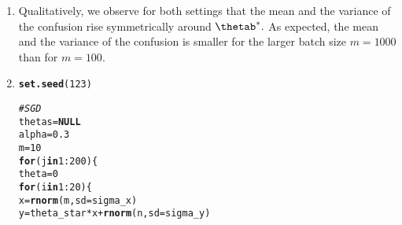 \documentclass[a4paper]{article}
\makeatletter
\newcommand{\hlnum}[1]{\textcolor[rgb]{0.686,0.059,0.569}{#1}}%
\newcommand{\hlstr}[1]{\textcolor[rgb]{0.192,0.494,0.8}{#1}}%
\newcommand{\hlcom}[1]{\textcolor[rgb]{0.678,0.584,0.686}{\textit{#1}}}%
\newcommand{\hlopt}[1]{\textcolor[rgb]{0,0,0}{#1}}%
\newcommand{\hlstd}[1]{\textcolor[rgb]{0.345,0.345,0.345}{#1}}%
\newcommand{\hlkwa}[1]{\textcolor[rgb]{0.161,0.373,0.58}{\textbf{#1}}}%
\newcommand{\hlkwb}[1]{\textcolor[rgb]{0.69,0.353,0.396}{#1}}%
\newcommand{\hlkwc}[1]{\textcolor[rgb]{0.333,0.667,0.333}{#1}}%
\newcommand{\hlkwd}[1]{\textcolor[rgb]{0.737,0.353,0.396}{\textbf{#1}}}%
\newenvironment{kframe}{%
 \def\at@end@of@kframe{}%
 \ifinner\ifhmode%
  \def\at@end@of@kframe{\end{minipage}}%
  \begin{minipage}{\columnwidth}%
 \fi\fi%
 \def\FrameCommand##1{\hskip\@totalleftmargin \hskip-\fboxsep
 \colorbox{shadecolor}{##1}\hskip-\fboxsep
     \hskip-\linewidth \hskip-\@totalleftmargin \hskip\columnwidth}%
 \MakeFramed {\advance\hsize-\width
   \@totalleftmargin\z@ \linewidth\hsize
   \@setminipage}}%
 {\par\unskip\endMakeFramed%
 \at@end@of@kframe}
\newenvironment{knitrout}{}{} %
\makeatother
\begin{document}
{\begin{enumerate}
\begin{knitrout}
\begin{kframe}
\begin{alltt}
\hlcom{# compute confusions for m = 1000}

\hlstd{confs} \hlkwb{=} \hlkwd{c}\hlstd{()}
\hlstd{m} \hlkwb{=} \hlnum{1000}
\hlstd{reps} \hlkwb{=} \hlnum{200}
\hlstd{thetas} \hlkwb{=} \hlkwd{seq}\hlstd{(}\hlkwc{from}\hlstd{=}\hlnum{0}\hlstd{,} \hlkwc{to}\hlstd{=}\hlnum{1}\hlstd{,} \hlkwc{length.out} \hlstd{=} \hlnum{21}\hlstd{)}
\hlkwa{for}\hlstd{(i} \hlkwa{in} \hlnum{1}\hlopt{:}\hlstd{reps)\{}
  \hlkwa{for}\hlstd{(theta} \hlkwa{in} \hlstd{thetas)\{}
    \hlstd{confs} \hlkwb{=} \hlkwd{c}\hlstd{(confs,} \hlkwd{compute_conf}\hlstd{(theta, m))}
  \hlstd{\}}
\hlstd{\}}

\hlstd{p_batch1000} \hlkwb{=} \hlkwd{ggplot}\hlstd{(}\hlkwd{data.frame}\hlstd{(}\hlkwc{thetas} \hlstd{=} \hlkwd{rep}\hlstd{(thetas, reps),} \hlkwc{confs} \hlstd{= confs),}
                     \hlkwd{aes}\hlstd{(}\hlkwc{x} \hlstd{= thetas,} \hlkwc{y} \hlstd{= confs))} \hlopt{+}
  \hlkwd{geom_point}\hlstd{()} \hlopt{+} \hlkwd{xlab}\hlstd{(}\hlkwd{expression}\hlstd{(theta))} \hlopt{+} \hlkwd{ylim}\hlstd{(}\hlnum{0}\hlstd{,} \hlnum{0.4}\hlstd{)} \hlopt{+} \hlkwd{ggtitle}\hlstd{(}\hlstr{"m = 1000"}\hlstd{)}  \hlopt{+}
  \hlkwd{ylab}\hlstd{(}\hlstr{"confusion"}\hlstd{)}

\hlcom{# plot all}
\hlkwd{grid.arrange}\hlstd{(p_batch100, p_batch1000,} \hlkwc{ncol} \hlstd{=} \hlnum{2}\hlstd{)}
\end{alltt}
\end{kframe}
\texttt{[image: figure/mv-plot\_confusion-1]} 
\end{knitrout}
\item Qualitatively, we observe for both settings that the mean and the variance of the confusion rise symmetrically around $\thetab^*.$ As expected, the mean and the variance of the confusion is smaller for the larger batch size $m = 1000$ than for $m = 100$.
\item
\begin{knitrout}
\color{fgcolor}\begin{kframe}
\begin{alltt}
\hlkwd{set.seed}\hlstd{(}\hlnum{123}\hlstd{)}

\hlcom{# SGD}
\hlstd{thetas} \hlkwb{=} \hlkwa{NULL}
\hlstd{alpha} \hlkwb{=} \hlnum{0.3}
\hlstd{m} \hlkwb{=} \hlnum{10}
\hlkwa{for}\hlstd{(j} \hlkwa{in} \hlnum{1}\hlopt{:}\hlnum{200}\hlstd{)\{}
  \hlstd{theta} \hlkwb{=} \hlnum{0}
  \hlkwa{for}\hlstd{(i} \hlkwa{in} \hlnum{1}\hlopt{:}\hlnum{20}\hlstd{)\{}
    \hlstd{x} \hlkwb{=} \hlkwd{rnorm}\hlstd{(m,} \hlkwc{sd} \hlstd{= sigma_x)}
    \hlstd{y} \hlkwb{=} \hlstd{theta_star} \hlopt{*} \hlstd{x} \hlopt{+} \hlkwd{rnorm}\hlstd{(n,} \hlkwc{sd} \hlstd{= sigma_y)}


\end{alltt}
\end{kframe}
\end{knitrout}
\end{enumerate}}
\end{document}
